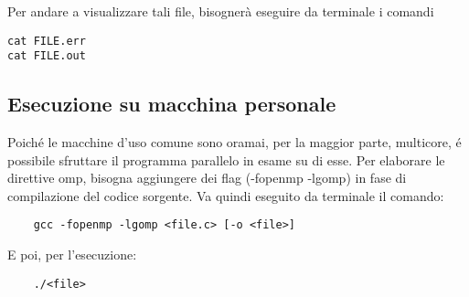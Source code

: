 Per andare a visualizzare tali file, bisognerà eseguire da terminale i comandi
\begin{lstlisting}
cat FILE.err
cat FILE.out
\end{lstlisting}

\subsection{Esecuzione su macchina personale}
Poiché le macchine d'uso comune sono oramai, per la maggior parte, multicore, é possibile sfruttare il programma parallelo in esame su di esse.
Per elaborare le direttive omp, bisogna aggiungere dei flag (-fopenmp -lgomp) in fase di compilazione del codice sorgente.
Va quindi eseguito da terminale il comando:
\begin{lstlisting}
    gcc -fopenmp -lgomp <file.c> [-o <file>]
\end{lstlisting}
E poi, per l'esecuzione:
\begin{lstlisting}
    ./<file>
\end{lstlisting}